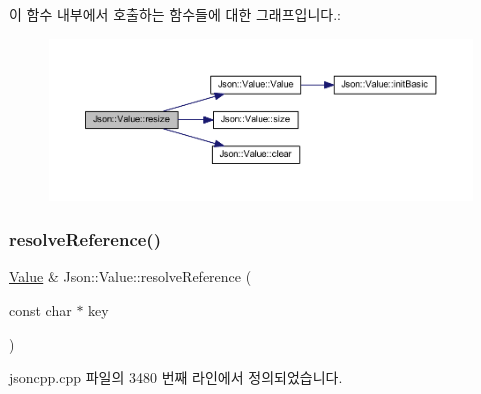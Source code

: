 이 함수 내부에서 호출하는 함수들에 대한 그래프입니다.\+:
\nopagebreak
\begin{figure}[H]
\begin{center}
\leavevmode
\includegraphics[width=350pt]{class_json_1_1_value_aa284353271ada427dbfa04a42f2be407_cgraph}
\end{center}
\end{figure}
\mbox{\label{class_json_1_1_value_a9ff9cdae2c8f4155bab603d750b0b3f1}} 
\subsubsection{\texorpdfstring{resolve\+Reference()}{resolveReference()}\hspace{0.1cm}{\footnotesize\ttfamily [1/2]}}
{\footnotesize\ttfamily \hyperlink{class_json_1_1_value}{Value} \& Json\+::\+Value\+::resolve\+Reference (\begin{DoxyParamCaption}\item[{const char $\ast$}]{key }\end{DoxyParamCaption})\hspace{0.3cm}{\ttfamily [private]}}



jsoncpp.\+cpp 파일의 3480 번째 라인에서 정의되었습니다.


